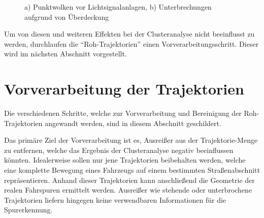 \begin{figure}[H]
    \centering
    \qquad
    \caption{a) Punktwolken vor Lichtsignalanlagen, b) Unterbrechungen aufgrund von Überdeckung}
    \label{fig:real_defects_trajectories}
\end{figure}

Um von diesen und weiteren Effekten bei der Clusteranalyse nicht beeinflusst zu werden, durchlaufen die
``Roh-Trajektorien'' einen Vorverarbeitungsschritt. Dieser wird im nächsten Abschnitt vorgestellt.

\section{Vorverarbeitung der Trajektorien}
\label{sec:realisation_preprocessing}

Die verschiedenen Schritte, welche zur Vorverarbeitung und Bereinigung der Roh-Trajektorien angewandt werden,
sind in diesem Abschnitt geschildert.

Das primäre Ziel der Vorverarbeitung ist es, Ausreißer aus der
Trajektorie-Menge zu entfernen, welche das Ergebnis der Clusteranalyse negativ beeinflussen könnten.
Idealerweise sollen nur jene Trajektorien beibehalten werden, welche eine komplette Bewegung eines
Fahrzeugs auf einem bestimmten Straßenabschnitt repräsentieren. Anhand dieser Trajektorien kann
anschließend die Geometrie der realen Fahrspuren ermittelt werden. Ausreißer wie stehende oder unterbrochene Trajektorien
liefern hingegen keine verwendbaren Informationen für die Spurerkennung.

